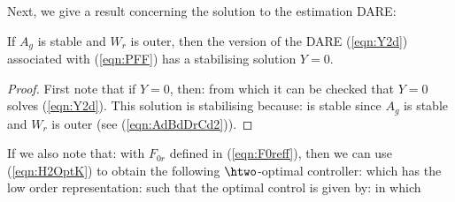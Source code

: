 Next, we give a result concerning the solution to the estimation DARE:
\begin{lem}
If $A_g$ is stable and $W_r$ is outer, then the version of the DARE (\ref{eqn:Y2d}) associated with (\ref{eqn:PFF}) has a stabilising solution $Y=0$.
\end{lem}
\begin{proof}
First note that if $Y=0$, then:
from which it can be checked that $Y=0$ solves (\ref{eqn:Y2d}). This solution is stabilising because:
is stable since $A_g$ is stable and $W_r$ is outer (see (\ref{eqn:AdBdDrCd2})).
\end{proof}
If we also note that:
with $F_{0r}$ defined in (\ref{eqn:F0reff}),
then we can use (\ref{eqn:H2OptK}) to obtain the following $\htwo$-optimal controller:
%
which has the low order representation:
%
such that the optimal control is given by:
in which
